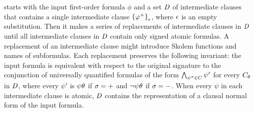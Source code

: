 \newcnf{} starts with the input first-order formula $\phi$ and a set $\mathit{D}$ of intermediate clauses that contains a single intermediate clause ${\{{\varphi}^{+}\}}_{\epsilon}$, where $\epsilon$ is an empty substitution. Then it makes a series of replacements of in\-ter\-me\-di\-ate clauses in $\mathit{D}$ until all intermediate clauses in $\mathit{D}$ contain only signed atomic formulas. A replacement of an intermediate clause might introduce Skolem functions and names of subformulas. Each replacement preserves the following invariant: the input formula is equivalent with respect to the original signature to the conjunction of universally quantified formulas of the form $\bigwedge_{{\psi}^{\sigma} \in C} \psi'$ for every ${C}_{\theta}$ in $\mathit{D}$, where every $\psi'$ is $\psi \theta$ if $\sigma = +$ and $\neg\psi \theta$ if $\sigma = -$. When every $\psi$ in each intermediate clause is atomic, $\mathit{D}$ contains the representation of a clausal normal form of the input formula.





